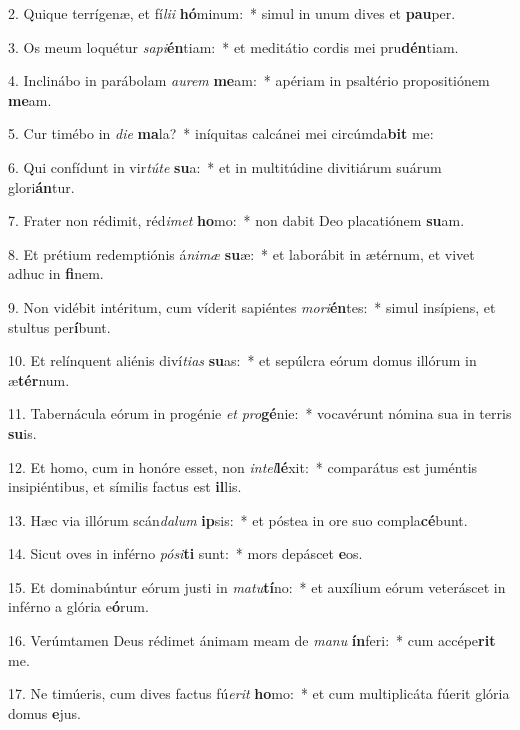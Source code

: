 2. Quique terrígenæ, et fí\textit{li}\textit{i} \textbf{hó}minum:~*  simul in unum dives et \textbf{pau}per.\

3. Os meum loquétur \textit{sa}\textit{pi}\textbf{én}tiam:~*  et meditátio cordis mei pru\textbf{dén}tiam.\

4. Inclinábo in parábolam \textit{au}\textit{rem} \textbf{me}am:~*  apériam in psaltério propositiónem \textbf{me}am.\

5. Cur timébo in \textit{di}\textit{e} \textbf{ma}la?~*  iníquitas calcánei mei circúmda\textbf{bit} me:\

6. Qui confídunt in vir\textit{tú}\textit{te} \textbf{su}a:~*  et in multitúdine divitiárum suárum glori\textbf{án}tur.\

7. Frater non rédimit, réd\textit{i}\textit{met} \textbf{ho}mo:~*  non dabit Deo placatiónem \textbf{su}am.\

8. Et prétium redemptiónis á\textit{ni}\textit{mæ} \textbf{su}æ:~*  et laborábit in ætérnum, et vivet adhuc in \textbf{fi}nem.\

9. Non vidébit intéritum, cum víderit sapiéntes \textit{mo}\textit{ri}\textbf{én}tes:~*  simul insípiens, et stultus per\textbf{í}bunt.\

10. Et relínquent aliénis diví\textit{ti}\textit{as} \textbf{su}as:~*  et sepúlcra eórum domus illórum in æ\textbf{tér}num.\

11. Tabernácula eórum in progénie \textit{et} \textit{pro}\textbf{gé}nie:~*  vocavérunt nómina sua in terris \textbf{su}is.\

12. Et homo, cum in honóre esset, non \textit{in}\textit{tel}\textbf{lé}xit:~*  comparátus est juméntis insipiéntibus, et símilis factus est \textbf{il}lis.\

13. Hæc via illórum scán\textit{da}\textit{lum} \textbf{ip}sis:~*  et póstea in ore suo compla\textbf{cé}bunt.\

14. Sicut oves in inférno \textit{pó}\textit{si}\textbf{ti} sunt:~*  mors depáscet \textbf{e}os.\

15. Et dominabúntur eórum justi in \textit{ma}\textit{tu}\textbf{tí}no:~*  et auxílium eórum veteráscet in inférno a glória e\textbf{ó}rum.\

16. Verúmtamen Deus rédimet ánimam meam de \textit{ma}\textit{nu} \textbf{ín}feri:~*  cum accépe\textbf{rit} me.\

17. Ne timúeris, cum dives factus fú\textit{e}\textit{rit} \textbf{ho}mo:~*  et cum multiplicáta fúerit glória domus \textbf{e}jus.\

